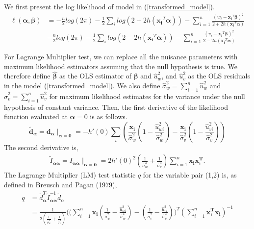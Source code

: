 \documentclass[12pt]{article}
\theoremstyle{theorem}
\begin{document}
\noindent 
We first present the log likelihood of model in (\ref{transformed_model}).
\begin{align*}
\ell(\bm{\alpha, \beta}) &= -\frac{n}{2} log(2\pi) - \frac{1}{2} \sum_i log(2 + 2h(\bm{x_i}^T \bm{\alpha})) - \sum_{i=1}^{n} \frac{(w_i - \bm{x_i}^T \bm{\beta})^2}{2 + 2h(\bm{x_i}^T \bm{\alpha})} \\
&-\frac{n}{2} log(2\pi) - \frac{1}{2} \sum_i log(2 - 2h(\bm{x_i}^T \bm{\alpha})) - \sum_{i=1}^{n} \frac{(v_i - \bm{x_i}^T \bm{\beta})^2}{2 - 2h(\bm{x_i}^T \bm{\alpha})}
\end{align*}

\noindent For Lagrange Multiplier test, we can replace all the nuisance parameters with maximum likelihood estimators assuming that the null hypothesis is true. We therefore define $\hat{\bm{\beta}}$ as the OLS estimator of $\bm{\beta}$ and $\hat{u}_w^2$, and $\hat{u}_v^2$ as the OLS residuals in the model (\ref{transformed_model}). We also define $\hat{\sigma}_w^2 = \sum_{i=1}^{n} \hat{u}_w^2$ and $\hat{\sigma}_v^2 = \sum_{i=1}^{n} \hat{u}_v^2$ for maximum likelihood estimates for the variance under the null hypothesis of constant variance. Then, the first derivative of the likelihood function evaluated at $\bm{\alpha} = 0$ is as follows. 
\begin{equation}
\bm{\tilde{d}_{\alpha}} = \bm{d_{\alpha}}\mid_{\bm{\alpha}=\bm{0}} = -h'(0) \sum_i  \left(
\frac{\bm{x_i}}{\hat{\sigma}_{w}^2} \left(
1-\frac{\hat{u}_{wi}^2}{\hat{\sigma}_{w}^2}
\right)
-
\frac{\bm{x_i}}{\hat{\sigma}_{v}^2} \left(
1-\frac{\hat{u}_{vi}^2 }{\hat{\sigma}_{v}^2}
\right)
\right)
\label{first_derivative}
\end{equation}
The second derivative is,
\begin{align*}
\tilde{I}_{\bm{\alpha\alpha}} = I_{\bm{\alpha\alpha}} \mid_{\bm{\alpha} = \bm{0}} = 2h'(0)^2 \left( \frac{1}{\hat{\sigma}_w^4}  + \frac{1}{\hat{\sigma}_v^4}\right)\sum_{i=1}^{n}  \bm{x_i x_i^T}.
\end{align*}
The Lagrange Multiplier (LM) test statistic $q$ for the variable pair (1,2) is, as defined in Breusch and Pagan (1979), 
\begin{align}
q &= \tilde{d}_{\bm{\alpha}}^T \tilde{I}_{\bm{\alpha\alpha}}^{-1}\tilde{d}_{\alpha}\\
&= \frac{1}{2 \left(\frac{1}{\hat{\sigma}_w^4} + \frac{1}{\hat{\sigma}_v^4}\right)} 
\bigg(\bigg(
\sum_{i=1}^{n} \bm{x_{i}} 
\left(
\frac{1}{\hat{\sigma}_w^2} - \frac{\hat{u}_{wi}^2}{\hat{\sigma}_w^4}\right)  - \left( \frac{1}{\hat{\sigma}_v^2} - \frac{\hat{u}_{vi}^2}{\hat{\sigma}_v^4}
\right)
\bigg)^T 
\left( \sum_{i=1}^{n} \bm{x_i^T x_i} \right)^{-1}
\label{q}
\end{align}
\end{document}
